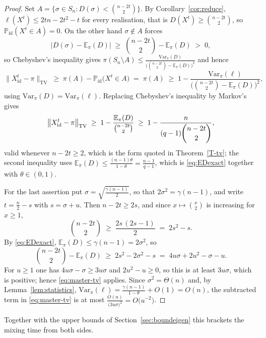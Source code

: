 \documentclass[11pt]{article}
\theoremstyle{plain}  %
\begin{document}
\begin{proof}
Set $A = \bigl\{\sigma \in S_n : D(\sigma) < \binom{n-2t}{2}\bigr\}$. By
Corollary~\ref{cor:reduce}, $\ell(X^{t}) \le 2tn-2t^{2}-t$ for every realisation, that is
$D(X^{t}) \ge \binom{n-2t}{2}$, so $\mathbb{P}_{\mathrm{id}}(X^{t} \in A) = 0$. On the other
hand $\sigma \notin A$ forces
$$
  \bigl|D(\sigma) - \mathbb{E}_\pi(D)\bigr|
  \;\ge\; \binom{n-2t}{2} - \mathbb{E}_\pi(D) \;>\; 0 ,
$$
so Chebyshev's inequality gives
$\pi(S_n \setminus A) \le \frac{\mathrm{Var}_\pi(D)}{\bigl(\binom{n-2t}{2}-\mathbb{E}_\pi(D)\bigr)^{2}}$
and hence
$$
  \bigl\|X^{t}_{\mathrm{id}}-\pi\bigr\|_{\mathrm{TV}}
  \;\ge\; \pi(A) - \mathbb{P}_{\mathrm{id}}\bigl(X^{t}\in A\bigr)
  \;=\; \pi(A)
  \;\ge\; 1 - \frac{\mathrm{Var}_\pi(\ell)}
                   {\bigl(\binom{n-2t}{2}-\mathbb{E}_\pi(D)\bigr)^{2}} ,
$$
using $\mathrm{Var}_\pi(D) = \mathrm{Var}_\pi(\ell)$. Replacing Chebyshev's inequality by
Markov's gives 
$$
  \bigl\|X^{t}_{\mathrm{id}}-\pi\bigr\|_{\mathrm{TV}}
  \;\ge\; 1 - \frac{\mathbb{E}_\pi(D)}{\binom{n-2t}{2}}
  \;\ge\; 1 - \frac{n}{(q-1)\dbinom{n-2t}{2}},
$$
valid whenever $n-2t \ge 2$, which is the form quoted in Theorem~\ref{T-tv}; the second
inequality uses $\mathbb{E}_\pi(D) \le \frac{(n-1)\theta}{1-\theta} = \frac{n-1}{q-1}$,
which is \eqref{eq:EDexact} together with $\theta \in (0,1)$.

For the last assertion put $\sigma = \sqrt{\frac{\gamma(n-1)}{2}}$, so that
$2\sigma^{2} = \gamma(n-1)$, and write $t = \frac n2 - s$ with $s = \sigma+u$. Then
$n-2t \ge 2s$, and since $x \mapsto \binom x2$ is increasing for $x \ge 1$,
$$
  \binom{n-2t}{2} \;\ge\; \frac{2s\,(2s-1)}{2} \;=\; 2s^{2}-s .
$$
By \eqref{eq:EDexact}, $\mathbb{E}_\pi(D) \le \gamma(n-1) = 2\sigma^{2}$, so
$$
  \binom{n-2t}{2} - \mathbb{E}_\pi(D)
  \;\ge\; 2s^{2}-2\sigma^{2}-s
  \;=\; 4u\sigma + 2u^{2} - \sigma - u .
$$
For $u \ge 1$ one has $4u\sigma-\sigma \ge 3u\sigma$ and $2u^{2}-u \ge 0$, so this is at
least $3u\sigma$, which is positive; hence \eqref{eq:master-tv} applies. Since
$\sigma^{2} = \Theta(n)$ and, by Lemma~\ref{lem:statistics},
$\mathrm{Var}_\pi(\ell) = \frac{\gamma(n-1)}{1-\theta}+O(1) = O(n)$, the subtracted term in
\eqref{eq:master-tv} is at most
$\frac{O(n)}{\big(3u\sigma\bigr)^{2}} = O\bigl(u^{-2}\bigr)$.

\end{proof}

Together with the upper bounds of Section~\ref{sec:boundeigen} this brackets the mixing
time from both sides.
\end{document}
